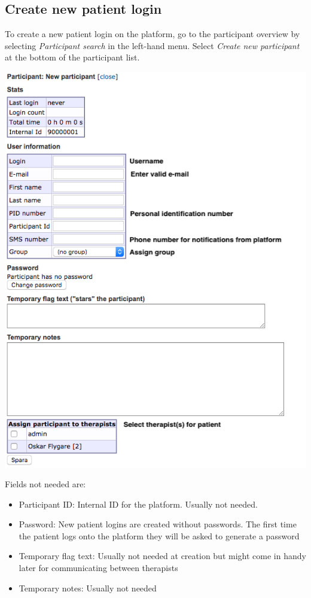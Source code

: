 \documentclass[]{book}
\providecommand{\tightlist}{%
  \setlength{\itemsep}{0pt}\setlength{\parskip}{0pt}}
\theoremstyle{definition}
\theoremstyle{definition}
\theoremstyle{definition}
\theoremstyle{remark}
\begin{document}
\hypertarget{create-new-patient-login}{%
\subsection{Create new patient login}\label{create-new-patient-login}}

To create a new patient login on the platform, go to the participant
overview by selecting \emph{Participant search} in the left-hand menu.
Select \emph{Create new participant} at the bottom of the participant
list.

\includegraphics{images/new-participant.png}

Fields not needed are:

\begin{itemize}
\tightlist
\item
  Participant ID: Internal ID for the platform. Usually not needed.
\item
  Password: New patient logins are created without passwords. The first
  time the patient logs onto the platform they will be asked to generate
  a password
\item
  Temporary flag text: Usually not needed at creation but might come in
  handy later for communicating between therapists
\item
  Temporary notes: Usually not needed
\end{itemize}
\end{document}
